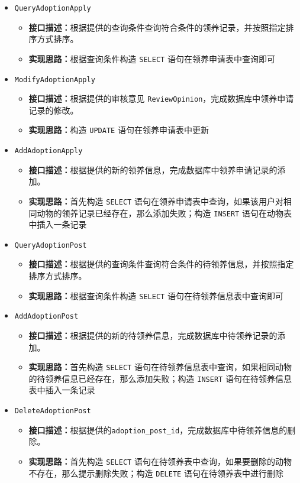 \documentclass[12pt,a4paper,UTF8]{article}
\begin{document}
\begin{itemize}

  \item \verb|QueryAdoptionApply|
  \begin{itemize}
  \item \textbf{接口描述：}根据提供的查询条件查询符合条件的领养记录，并按照指定排序方式排序。
  \item \textbf{实现思路：}根据查询条件构造 \verb|SELECT| 语句在领养申请表中查询即可
  \end{itemize}

  \item \verb|ModifyAdoptionApply|
  \begin{itemize}
  \item \textbf{接口描述：}根据提供的审核意见 \verb|ReviewOpinion|，完成数据库中领养申请记录的修改。
  \item \textbf{实现思路：}构造 \verb|UPDATE| 语句在领养申请表中更新
  \end{itemize}

  \item \verb|AddAdoptionApply|
  \begin{itemize}
  \item \textbf{接口描述：}根据提供的新的领养信息，完成数据库中领养申请记录的添加。
  \item \textbf{实现思路：}首先构造 \verb|SELECT| 语句在领养申请表中查询，如果该用户对相同动物的领养记录已经存在，那么添加失败；构造 \verb|INSERT| 语句在动物表中插入一条记录
  \end{itemize}

  \item \verb|QueryAdoptionPost|
  \begin{itemize}
  \item \textbf{接口描述：}根据提供的查询条件查询符合条件的待领养信息，并按照指定排序方式排序。
  \item \textbf{实现思路：}根据查询条件构造 \verb|SELECT| 语句在待领养信息表中查询即可
  \end{itemize}

  \item \verb|AddAdoptionPost|
  \begin{itemize}
  \item \textbf{接口描述：}根据提供的新的待领养信息，完成数据库中待领养记录的添加。
  \item \textbf{实现思路：}首先构造 \verb|SELECT| 语句在待领养信息表中查询，如果相同动物的待领养信息已经存在，那么添加失败；构造 \verb|INSERT| 语句在待领养信息表中插入一条记录
  \end{itemize}

  \item \verb|DeleteAdoptionPost|
  \begin{itemize}
  \item \textbf{接口描述：}根据提供的\verb|adoption_post_id|，完成数据库中待领养信息的删除。
  \item \textbf{实现思路：}首先构造 \verb|SELECT| 语句在待领养表中查询，如果要删除的动物不存在，那么提示删除失败；构造 \verb|DELETE| 语句在待领养表中进行删除
  \end{itemize}

\end{itemize}
\end{document}
